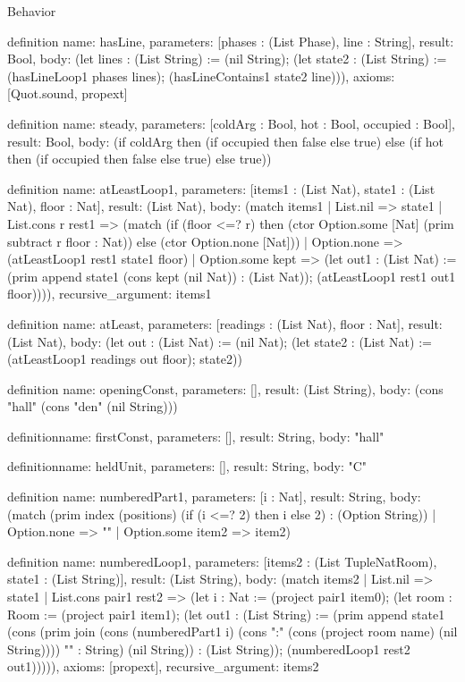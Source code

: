 \begin{lexlean}{Behavior}
\begin{semanticmodule}
definition{
  name: hasLine,
  parameters: [phases : (List Phase), line : String],
  result: Bool,
  body: (let lines : (List String) := (nil String); (let state2 : (List String) := (hasLineLoop1 phases lines); (hasLineContains1 state2 line))),
  axioms: [Quot.sound, propext]
}

definition{
  name: steady,
  parameters: [coldArg : Bool, hot : Bool, occupied : Bool],
  result: Bool,
  body: (if coldArg then (if occupied then false else true) else (if hot then (if occupied then false else true) else true))
}

definition{
  name: atLeastLoop1,
  parameters: [items1 : (List Nat), state1 : (List Nat), floor : Nat],
  result: (List Nat),
  body: (match items1
    | List.nil => state1
    | List.cons r rest1 => (match (if (floor <=? r) then (ctor Option.some [Nat] (prim subtract r floor : Nat)) else (ctor Option.none [Nat]))
      | Option.none => (atLeastLoop1 rest1 state1 floor)
      | Option.some kept => (let out1 : (List Nat) := (prim append state1 (cons kept (nil Nat)) : (List Nat)); (atLeastLoop1 rest1 out1 floor)))),
  recursive_argument: items1
}

definition{
  name: atLeast,
  parameters: [readings : (List Nat), floor : Nat],
  result: (List Nat),
  body: (let out : (List Nat) := (nil Nat); (let state2 : (List Nat) := (atLeastLoop1 readings out floor); state2))
}

definition{
  name: openingConst,
  parameters: [],
  result: (List String),
  body: (cons "hall" (cons "den" (nil String)))
}

definition{name: firstConst, parameters: [], result: String, body: "hall"}

definition{name: heldUnit, parameters: [], result: String, body: "C"}

definition{
  name: numberedPart1,
  parameters: [i : Nat],
  result: String,
  body: (match (prim index (positions) (if (i <=? 2) then i else 2) : (Option String))
    | Option.none => ""
    | Option.some item2 => item2)
}

definition{
  name: numberedLoop1,
  parameters: [items2 : (List TupleNatRoom), state1 : (List String)],
  result: (List String),
  body: (match items2
    | List.nil => state1
    | List.cons pair1 rest2 => (let i : Nat := (project pair1 item0); (let room : Room := (project pair1 item1); (let out1 : (List String) := (prim append state1 (cons (prim join (cons (numberedPart1 i) (cons ":" (cons (project room name) (nil String)))) "" : String) (nil String)) : (List String)); (numberedLoop1 rest2 out1))))),
  axioms: [propext],
  recursive_argument: items2
}


\end{semanticmodule}
\end{lexlean}
